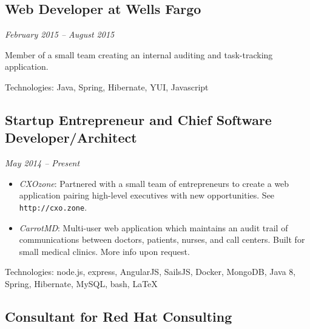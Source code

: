 \documentclass[a4paper,11pt]{article}
\begin{document}
\subsection*{Web Developer at Wells Fargo}
\vskip -20pt
\hfill \textit{February 2015 -- August 2015}

Member of a small team creating an internal auditing and task-tracking application.

Technologies: Java, Spring, Hibernate, YUI, Javascript

\subsection*{Startup Entrepreneur and Chief Software Developer/Architect}
\vskip -20pt
\hfill \textit{May 2014 -- Present}

\begin{itemize}

  \vskip 5pt
  \item \textit{CXOzone}: Partnered with a small team of entrepreneurs to create a web application
    pairing high-level executives with new opportunities. See \texttt{http://cxo.zone}.

  \item \textit{CarrotMD}: Multi-user web application which maintains an audit trail of
    communications between doctors, patients, nurses, and call centers. Built for small medical
    clinics. More info upon request.

\end{itemize}

Technologies: node.js, express, AngularJS, SailsJS, Docker, MongoDB, Java 8, Spring, Hibernate,
MySQL, bash, \LaTeX

\subsection*{Consultant for Red Hat Consulting}
\end{document}
